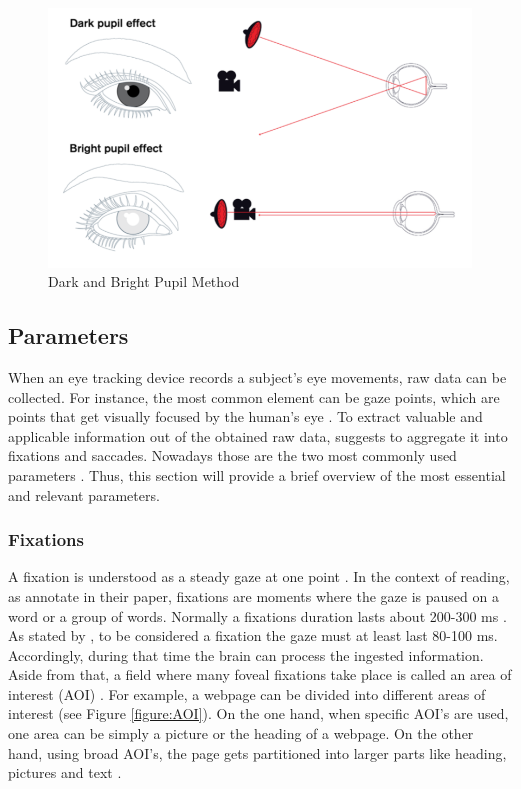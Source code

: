 \begin{figure}[!ht]
    \centering
    \includegraphics[width=1\linewidth]{images/DarkBright.png}
    \caption{
        Dark and Bright Pupil Method \autocite[]{tobii2018dark}
    }
    \label{figure:DarkBright}
\end{figure}


\subsection{Parameters}
\label{subsection:Parameters}
When an eye tracking device records a subject's eye movements, raw data can be collected. For instance, the most common element can be gaze points, which are points that get visually focused by the human's eye \autocite{bojko2009informative, vspakov2007visualization}. To extract valuable and applicable information out of the obtained raw data, \textcite[]{blascheck2014state}  suggests to aggregate it into fixations and saccades. 
Nowadays those are the two most commonly used parameters \autocite{bruneau2002eyes}. Thus, this section will provide a brief overview of the most essential and relevant parameters.

\subsubsection{Fixations}
A fixation is understood as a steady gaze at one point \autocite[]{buscher2009you}.  In the context of reading, as \textcite[]{beymer2007eye} annotate in their paper, fixations are moments where the gaze is paused on a word or a group of words. 
Normally a fixations duration lasts about 200-300 ms \autocite[]{kasneci2015online}. As stated by \textcite[]{buscher2009you}, to be considered a fixation the gaze must at least last 80-100 ms. Accordingly, during that time the brain can process the ingested information. Aside from that, a field where many foveal fixations take place is called an area of interest (AOI) \autocite[]{djamasbi2014eye}. For example, a webpage can be divided into different areas of interest (see Figure \ref{figure:AOI}).  On the one hand, when specific AOI's are used, one area can be simply a picture or the heading of a webpage. On the other hand, using broad AOI's, the page gets partitioned into larger parts like heading, pictures and text \autocite{djamasbi2014eye}. \\

